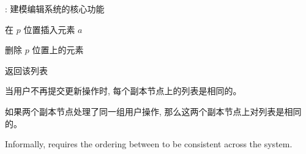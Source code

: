 \begin{frame}{}
  \centerline{\Large {}: 建模编辑系统的核心功能}
  \vspace{0.30cm}

  \begin{center}
    \begin{minipage}{0.70\textwidth}
      \begin{description}
	\setlength{\itemsep}{10pt}
	\item[$\textsc{Ins}(a, p):$] 在 $p$ 位置插入元素 $a$
	\item[$\textsc{Del}(p):$] 删除 $p$ 位置上的元素
	\item[$\textsc{Read}:$] 返回该列表
      \end{description}
    \end{minipage}
  \end{center}
\end{frame}

\begin{frame}{}
  \begin{cdef}
    当用户不再提交更新操作时, 每个副本节点上的列表是相同的。
  \end{cdef}

  \pause
  \vspace{0.50cm}

  \begin{cdef}
    如果两个副本节点处理了同一组用户操作, 那么这两个副本节点上对列表是相同的。
  \end{cdef}

  \pause
  \vspace{0.60cm}
  \centerline{}
\end{frame}

\begin{frame}{}

  \vspace{0.20cm}
  \begin{cdef}
    Informally, \wlspec{} requires the ordering between  to be consistent across the system.
  \end{cdef}

  \vspace{0.60cm}
  \centerline{}
\end{frame}

